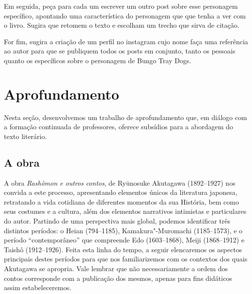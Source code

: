 \documentclass[12pt]{extarticle}
\begin{document}
Em seguida, peça para cada um escrever um outro post sobre esse personagem específico, 
apontando uma característica do personagem que que tenha a ver com o livro. Sugira que 
retomem o texto e escolham um trecho que sirva de citação. 

For fim, sugira a criação 
de um perfil no instagram cujo nome faça uma referência ao autor para que 
se publiquem todos os posts em conjunto, tanto os pessoais quanto os 
específicos sobre o personagem de Bungo Tray Dogs. 





\section{Aprofundamento}

Nesta seção, desenvolvemos um trabalho de aprofundamento que, em diálogo com a
formação continuada de professores, oferece subsídios para a abordagem do texto
literário.

\subsection{A obra}

A obra \emph{Rashômon e outros contos}, de Ryūnosuke Akutagawa (1892--1927) nos
convida a este processo, apresentando elementos únicos da literatura japonesa,
retratando a vida cotidiana de diferentes momentos da sua História, bem como
seus costumes e a cultura, além dos elementos narrativos intimistas e
particulares do autor. Partindo de uma perspectiva mais global, podemos
identificar três distintos períodos: o Heian (794--1185), Kamakura"-Muromachi
(1185--1573), e o período ``contemporâneo'' que compreende Edo (1603--1868),
Meiji (1868--1912) e Taishô (1912--1926). Feita esta linha do tempo, a seguir
elencaremos os aspectos principais destes períodos para que nos familiarizemos
com os contextos dos quais Akutagawa se apropria. Vale lembrar que não
necessariamente a ordem dos contos corresponde com a publicação dos mesmos,
apenas para fins didáticos assim estabeleceremos.


\end{document}
